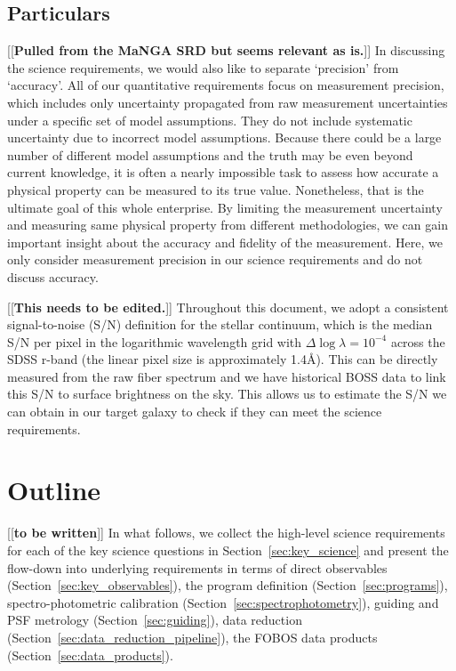\documentclass[11pt,a4paper,twoside,onecolumn,openany,final,oldfontcommands]{memoir}
\newcommand{\edit}[2][todo]{{\color{#1}[[{\bf #2}]]}}
\begin{document}
\subsection{Particulars}

\edit{Pulled from the MaNGA SRD but seems relevant as is.} In discussing the science requirements, we would also like to separate `precision' from `accuracy'. All of our quantitative requirements focus on measurement precision, which includes only uncertainty propagated from raw measurement uncertainties under a specific set of model assumptions. They do not include systematic uncertainty due to incorrect model assumptions. Because there could be a large number of different model assumptions and the truth may be even beyond current knowledge, it is often a nearly impossible task to assess how accurate a physical property can be measured to its true value. Nonetheless, that is the ultimate goal of this whole enterprise. By limiting the measurement uncertainty and measuring same physical property from different methodologies, we can gain important insight about the accuracy and fidelity of the measurement. Here, we only consider measurement precision in our science requirements and do not discuss accuracy.

\edit{This needs to be edited.}
Throughout this document, we adopt a consistent signal-to-noise (S/N) definition for the stellar continuum, which is the median S/N per pixel in the logarithmic wavelength grid with $\Delta \log \lambda = 10^{-4}$ across the SDSS r-band (the linear pixel size is approximately 1.4\AA). This can be directly measured from the raw fiber spectrum and we have historical BOSS data to link this S/N to surface brightness on the sky. This allows us to estimate the S/N we can obtain in our target galaxy to check if they can meet the science requirements.

\section{Outline}

\edit{to be written}
In what follows, we collect the high-level science requirements for each of the key science questions in Section~\ref{sec:key_science} and present the flow-down into underlying requirements in terms of direct observables (Section~\ref{sec:key_observables}), the program definition (Section~\ref{sec:programs}), spectro-photometric calibration (Section~\ref{sec:spectrophotometry}), guiding and PSF metrology (Section~\ref{sec:guiding}), data reduction (Section~\ref{sec:data_reduction_pipeline}), the FOBOS data products (Section~\ref{sec:data_products}).
\end{document}

